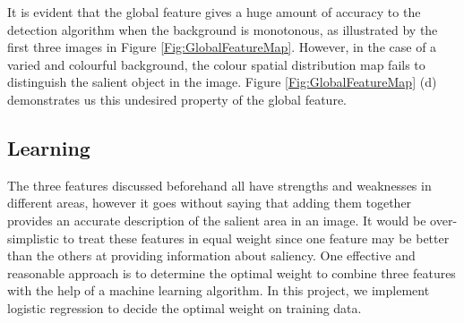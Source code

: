 \documentclass[10pt,twocolumn,letterpaper]{article}
\begin{document}
It is evident that the global feature gives a huge amount of accuracy to the detection algorithm when the background is monotonous, as illustrated by the first three images in Figure \ref{Fig:GlobalFeatureMap}. However, in the case of a varied and colourful background, the colour spatial distribution map fails to distinguish the salient object in the image. Figure \ref{Fig:GlobalFeatureMap} (d) demonstrates us this undesired property of the global feature. 








\newcommand{\bl}{\boldsymbol{\lambda}}
\newcommand{\bt}{\boldsymbol{t}}
\newcommand{\btx}{\boldsymbol{t}_x}
\newcommand{\bphix}{\boldsymbol{\phi}_x}

\subsection{Learning}
The three features discussed beforehand all have strengths and weaknesses in different areas, however it goes without saying that adding them together provides an accurate description of the salient area in an image.  It would be over-simplistic to treat these features in equal weight since one feature may be better than the others at providing information about saliency. One effective and reasonable approach is to determine the optimal weight to combine three features with the help of a machine learning algorithm.  In this project, we implement logistic regression to decide the optimal weight on training data.
\end{document}
